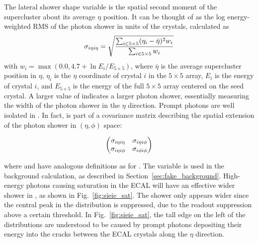 The lateral shower shape variable \sieie is the spatial second moment of the supercluster about its average $\eta$ position. It can be thought of as the log energy-weighted RMS of the photon shower in units of the crystals, calculated as
\begin{equation}
	\sigma_{i\eta i\eta} = \sqrt{
		\frac{\sum_{i \in 5{\times}5}(\eta_i-\bar{\eta})^2 w_i}{\sum_{i \in 5{\times}5} w_i}
	}
\end{equation}
with $w_i = \max{\left(0.0, 4.7 + \ln{E_i/E_{5{\times}5}}\right)}$, where $\bar{\eta}$ is the average supercluster position in $\eta$, $\eta_i$ is the $\eta$ coordinate of crystal $i$ in the $5{\times}5$ array, $E_i$ is the energy of crystal $i$, and $E_{5{\times}5}$ is the energy of the full $5{\times}5$ array centered on the seed crystal. A larger value of \sieie indicates a larger photon shower, essentially measuring the width of the photon shower in the $\eta$ direction. Prompt photons are well isolated in \sieie. In fact, \sieie is part of a covariance matrix describing the spatial extension of the photon shower in $(\eta,\phi)$ space:
\begin{singlespace}
	\begin{equation*}
		\begin{pmatrix}
			\sigma_{i\eta i\eta} & \sigma_{i\eta i\phi} \\
			\sigma_{i\eta i\phi} & \sigma_{i\phi i\phi} \\
		\end{pmatrix}
		\vspace*{\baselineskip}
	\end{equation*}
\end{singlespace}\noindent\ignorespaces
where \sipip and \sieip have analogous definitions as for \sieie. The variable \sipip is used in the background calculation, as described in Section~\ref{sec:fake_background}. High-energy photons causing saturation in the ECAL will have an effective wider shower in \sieie, as shown in Fig.~\ref{fig:sieie_sat}. The shower only appears wider since the central peak in the \sieie distribution is suppressed, due to the readout suppression above a certain threshold. In Fig.~\ref{fig:sieie_sat}, the tall edge on the left of the \sieie distributions are understood to be caused by prompt photons depositing their energy into the cracks between the ECAL crystals along the $\eta$ direction.

